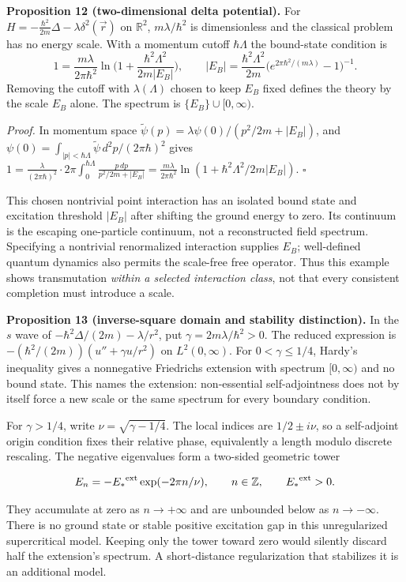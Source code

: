 \documentclass[11pt,a4paper]{article}
\begin{document}
\textbf{Proposition 12 (two-dimensional delta potential).} For
\(H=-\frac{\hbar^2}{2m}\Delta-\lambda\delta^2(\vec r)\) on
\(\mathbb R^2\), \(m\lambda/\hbar^2\) is dimensionless and the classical
problem has no energy scale. With a momentum cutoff \(\hbar\Lambda\) the
bound-state condition is
\[1=\frac{m\lambda}{2\pi\hbar^2}\ln\Big(1+\frac{\hbar^2\Lambda^2}{2m|E_B|}\Big),
\qquad
|E_B|=\frac{\hbar^2\Lambda^2}{2m}\Big(e^{2\pi\hbar^2/(m\lambda)}-1\Big)^{-1}.\]
Removing the cutoff with \(\lambda(\Lambda)\) chosen to keep \(E_B\)
fixed defines the theory by the scale \(E_B\) alone. The spectrum is
\(\{E_B\}\cup[0,\infty)\).

\emph{Proof.} In momentum space
\(\tilde\psi(p)=\lambda\psi(0)/(p^2/2m+|E_B|)\), and
\(\psi(0)=\int_{|p|<\hbar\Lambda}\tilde\psi\,d^2p/(2\pi\hbar)^2\) gives
\(1=\frac{\lambda}{(2\pi\hbar)^2}\cdot2\pi\int_0^{\hbar\Lambda} \frac{p\,dp}{p^2/2m+|E_B|}=\frac{m\lambda}{2\pi\hbar^2}\ln(1+\hbar^2\Lambda^2/2m|E_B|)\).
\(\square\)

This chosen nontrivial point interaction has an isolated bound state and
excitation threshold \(|E_B|\) after shifting the ground energy to zero.
Its continuum is the escaping one-particle continuum, not a
reconstructed field spectrum. Specifying a nontrivial renormalized
interaction supplies \(E_B\); well-defined quantum dynamics also permits
the scale-free free operator. Thus this example shows transmutation
\emph{within a selected interaction class}, not that every consistent
completion must introduce a scale.

\textbf{Proposition 13 (inverse-square domain and stability
distinction).} In the \(s\) wave of \(-\hbar^2\Delta/(2m)-\lambda/r^2\),
put \(\gamma=2m\lambda/\hbar^2>0\). The reduced expression is
\(-(\hbar^2/(2m))(u''+\gamma u/r^2)\) on \(L^2(0,\infty)\). For
\(0<\gamma\le1/4\), Hardy's inequality gives a nonnegative Friedrichs
extension with spectrum \([0,\infty)\) and no bound state. This names
the extension: non-essential self-adjointness does not by itself force a
new scale or the same spectrum for every boundary condition.

For \(\gamma>1/4\), write \(\nu=\sqrt{\gamma-1/4}\). The local indices
are \(1/2\pm i\nu\), so a self-adjoint origin condition fixes their
relative phase, equivalently a length modulo discrete rescaling. The
negative eigenvalues form a two-sided geometric tower

\[E_n=-{E_*}^{\rm ext}\exp(-2\pi n/\nu),\qquad n\in\mathbb Z,
\qquad {E_*}^{\rm ext}>0.\]

They accumulate at zero as \(n\to+\infty\) and are unbounded below as
\(n\to-\infty\). There is no ground state or stable positive excitation
gap in this unregularized supercritical model. Keeping only the tower
toward zero would silently discard half the extension's spectrum. A
short-distance regularization that stabilizes it is an additional model.
\end{document}
